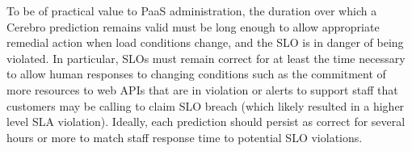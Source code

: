 


To be of practical value to PaaS administration, the duration over which a
Cerebro prediction remains valid must be long enough to allow appropriate
remedial action when load conditions change, and the SLO is in danger of being
violated.  In particular, SLOs must remain correct for at least the time
necessary to allow human responses to changing conditions such as
the commitment of more resources to web APIs that are in violation or alerts
to support staff that customers may be calling to claim SLO breach (which 
likely resulted in a higher level SLA violation).  Ideally,
each prediction should persist as correct for several hours or more to match
staff response time to potential SLO violations.


